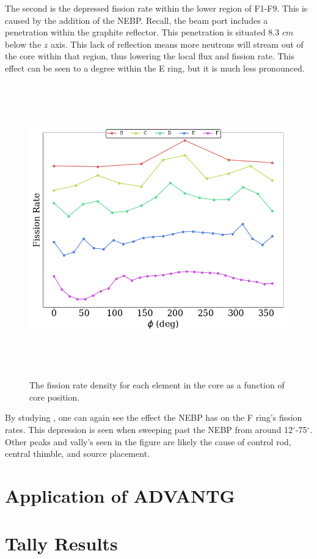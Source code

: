 The second is the depressed fission rate within the lower region of F1-F9.
This is caused by the addition of the NEBP.
Recall, the beam port includes a penetration within the graphite reflector. 
This penetration is situated 8.3 $cm$ below the $z$ axis.
This lack of reflection means more neutrons will stream out of the core within that region, thus lowering the local flux and fission rate.
This effect can be seen to a degree within the E ring, but it is much less pronounced.

\clearpage

\begin{figure}[htb]
\centering
\includegraphics[height=5in]{tex/figures/totals_azi.png}
\caption[Whole Core Azimuthal Fission Rate Density]{The fission rate density for each element in the core as a function of core position.}
\label{fig:totals_azi}
\end{figure}

By studying , one can again see the effect the NEBP has on the F ring's fission rates.
This depression is seen when sweeping past the NEBP from around 12$^{\circ}$-75$^{\circ}$.
Other peaks and vally's seen in the figure are likely the cause of control rod, central thimble, and source placement.


\section{Application of ADVANTG}

\section{Tally Results}
